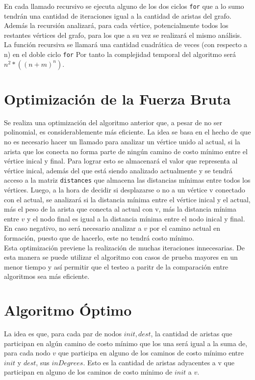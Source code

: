 \documentclass[a4paper,12pt,twocolumn]{article}
\begin{document}
		En cada llamado recursivo se ejecuta alguno de los dos ciclos \texttt{\ttfamily for} que a lo sumo tendrán una cantidad de iteraciones igual a la cantidad de aristas del grafo. Además la recursión analizará, para cada vértice, potencialmente todos los restantes vértices del grafo, para los que a su vez se realizará el mismo análisis. La función recursiva se llamará una cantidad cuadrática de veces (con respecto a n) en el doble ciclo \texttt{\ttfamily for} Por tanto la complejidad temporal del algoritmo será $n^2 * ((n + m)^n)$.\\
		
	\section{Optimización de la Fuerza Bruta}
	Se realiza una optimización del algoritmo anterior que, a pesar de no ser polinomial, es considerablemente más eficiente. La idea se basa en el hecho de que no es necesario hacer un llamado para analizar un vértice unido al actual, si la arista que los conecta no forma parte de ningún camino de costo mínimo entre el vértice inical y final. Para lograr esto se almacenará el valor que representa al vértice inical, además del que está siendo analizado actualmente y se tendrá acceso a la matriz \texttt{\ttfamily distances} que almacena las distancias mínimas entre todos los vértices. Luego, a la hora de decidir si desplazarse o no a un vértice v conectado con el actual, se analizará si la distancia mínima entre el vértice inical y el actual, más el peso de la arista que conecta al actual con v, más la distancia mínima entre $v$ y el nodo final es igual a la distancia mínima entre el nodo inical y final. En caso negativo, no será necesario analizar a $v$ por el camino actual en formación, puesto que de hacerlo, este no tendrá costo mínimo.\\
	
	Esta optimización previene la realización de muchas iteraciones innecesarias. De esta manera se puede utilizar el algoritmo con casos de prueba mayores en un menor tiempo y así permitir que el testeo a paritr de la comparación entre algoritmos sea más eficiente.\\
	
	\section{Algoritmo Óptimo}
	La idea es que, para cada par de nodos $init,dest$, la cantidad de aristas que participan en algún camino de costo mínimo que los una será igual a la suma de, para cada nodo $v$ que participa en alguno de los caminos de costo mínimo entre $init$ y $dest$, sus $inDegrees$. Esto es la cantidad de aristas adyacentes a v que participan en alguno de los caminos de costo mínimo de $init$ a $v$.\\
	
\end{document}
